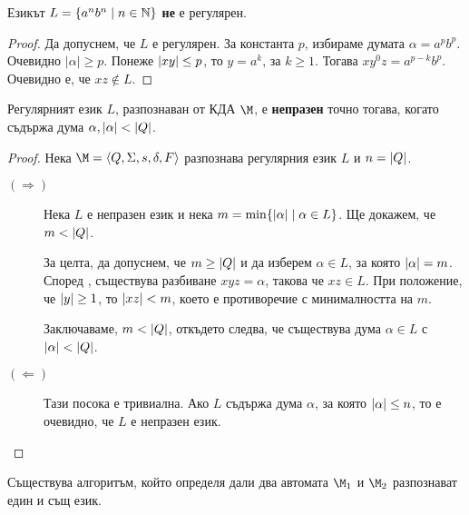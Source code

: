\begin{example}
  Езикът $L = \{a^nb^n \mid n\in \mathbb{N}\}$ {\bf не} е регулярен.
\end{example}
\begin{proof}
  Да допуснем, че $L$ е регулярен.
  За константа $p$, избираме думата $\alpha = a^pb^p$.
  Очевидно $|\alpha| \geq p$.
  Понеже $\vert{xy}\vert \leq p$, то $y = a^k$, за  $k \geq 1$.
  Тогава $xy^0z = a^{p-k}b^p$.
  Очевидно е, че $xz \not\in L$.
\end{proof}

\begin{prop}
  Регулярният език $L$, разпознаван от КДА $\M$, е {\bf непразен} точно тогава, когато съдържа дума $\alpha, \vert{\alpha}\vert < \vert{Q}\vert$.
\end{prop}
\begin{proof}
  Нека $\M = \FA$ разпознава регулярния език $L$ и $n = \vert{Q}\vert$.
  \begin{description}
  \item[$(\Rightarrow)$]
    Нека $L$ е непразен език и нека $m = \min\{\vert{\alpha}\vert \mid \alpha \in L\}$.
    Ще докажем, че $m < \vert{Q}\vert$.
    
    За целта, да допуснем, че $m \geq \vert{Q}\vert$ и да изберем $\alpha \in L$, за която $\vert{\alpha}\vert = m$.
    Според , съществува разбиване $xyz = \alpha$, 
    такова че $xz \in L$.
    При положение, че $\vert{y}\vert \geq 1$, то $\vert{xz}\vert < m$, което 
    е противоречие с минималността на $m$.
    
    Заключаваме, $m < \vert{Q}\vert$, откъдето следва, че 
    съществува дума $\alpha \in L$ с $\vert{\alpha}\vert < \vert{Q}\vert$.
  \item[$(\Leftarrow)$]
    Тази посока е тривиална.
    Ако $L$ съдържа дума $\alpha$, за която $\vert{\alpha}\vert \leq n$,
    то е очевидно, че $L$ е непразен език.
  \end{description}
\end{proof}

\begin{cor}
  Съществува алгоритъм, който определя дали два автомата $\M_1$ и $\M_2$ разпознават един и същ език.
\end{cor}


